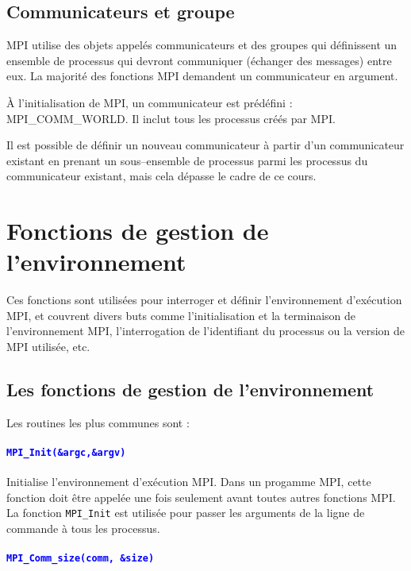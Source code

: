 \documentclass[11pt,a4paper]{article}
\begin{document}
\subsection{Communicateurs et groupe}

MPI utilise des objets appelés communicateurs et des groupes qui définissent un ensemble de processus
qui devront communiquer (échanger des messages) entre eux. La majorité des fonctions MPI demandent un
communicateur en argument.

\`A l'initialisation de MPI, un communicateur  est prédéfini : MPI\_COMM\_WORLD. Il inclut tous les
processus créés par MPI. 

Il est possible de définir un nouveau communicateur à partir d'un communicateur existant 
en prenant un sous--ensemble de processus parmi les processus du communicateur existant, mais cela
dépasse le cadre de ce cours.

\section{Fonctions de gestion de l'environnement}

Ces fonctions sont utilisées pour interroger et définir l'environnement d'exécution MPI, et couvrent divers buts comme
l'initialisation et la terminaison de l'environnement MPI, l'interrogation de l'identifiant du processus ou la version de MPI utilisée, etc. 

\subsection{Les fonctions de gestion de l'environnement}

Les routines les plus communes sont :

\paragraph{\textcolor{blue}{\texttt{MPI\_Init(\&argc,\&argv)}}}

  Initialise l'environnement d'exécution MPI. Dans un progamme MPI, cette fonction doit être appelée une fois seulement avant toutes autres fonctions MPI. 
  La fonction \texttt{MPI\_Init} est utilisée pour passer les arguments de la ligne de commande à tous les processus.

\paragraph{\textcolor{blue}{\texttt{MPI\_Comm\_size(comm, \&size)}}}
\end{document}
